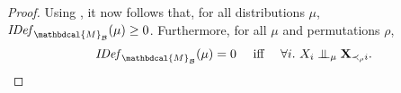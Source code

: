 \documentclass{article}
\theoremstyle{plain}
\theoremstyle{definition}
\theoremstyle{remark}
\let\H\relax
\DeclareMathOperator{\H}{\mathrm{H}} %
\newcommand{\CI}{\mathrel{\perp\mspace{-10mu}\perp}} %
\newcommand{\dg}[1]{\mathbdcal{#1}}
\newcommand\Pa{\mathbf{Pa}}
\newcommand{\IDef}[1]{\mathit{IDef}_{#1}}
\newcommand{\PDGof}[1]{{\dg M}_{#1}}
\numberwithin{equation}{section}
\begin{document}
\begin{proof}
Using , it now follows that,
for all distributions $\mu$,
$\IDef{\PDGof{\mathcal B}}(\mu) \ge 0$.
Furthermore, for all $\mu$ and permutations $\rho$,
\begin{equation}\label{eq:key}
  \IDef{\PDGof{\mathcal B}}(\mu) = 0 \quad\mbox{ iff }\quad 
    \forall i.~X_i \CI_\mu {\bf X}_{\prec_\rho i}.
\end{equation}


\end{proof}
\end{document}
